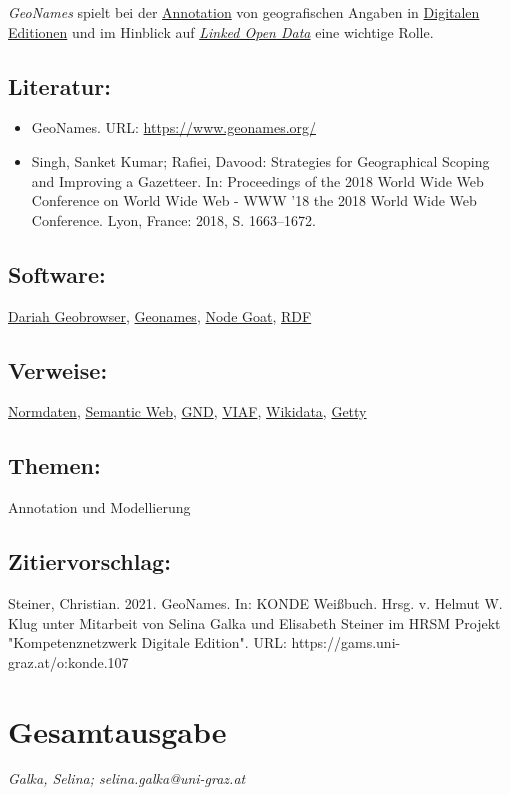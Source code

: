 \documentclass{article}
\begin{document}
        \emph{GeoNames} spielt bei der \href{http://gams.uni-graz.at/o:konde.17}{Annotation} von geografischen Angaben in \href{http://gams.uni-graz.at/o:konde.59}{Digitalen Editionen} und im Hinblick
                  auf \emph{\href{http://gams.uni-graz.at/o:konde.8}{Linked Open Data}} eine wichtige Rolle.\\
            
        \subsection*{Literatur:}\begin{itemize}\item GeoNames. URL: \url{https://www.geonames.org/}\item Singh, Sanket Kumar; Rafiei, Davood: Strategies for Geographical Scoping and Improving a
                              Gazetteer. In: Proceedings of the 2018 World Wide Web Conference on
                              World Wide Web - WWW '18 the 2018 World Wide Web Conference. Lyon, France: 2018, S. 1663–1672.\end{itemize}\subsection*{Software:}\href{https://geobrowser.de.dariah.eu/}{Dariah
                           Geobrowser}, \href{geonames.org}{Geonames}, \href{https://nodegoat.net/}{Node Goat}, \href{https://www.w3.org/RDF/}{RDF}\subsection*{Verweise:}\href{https://gams.uni-graz.at/o:konde.147}{Normdaten}, \href{https://gams.uni-graz.at/o:konde.167}{Semantic Web}, \href{https://gams.uni-graz.at/o:konde.109}{GND}, \href{https://gams.uni-graz.at/o:konde.111}{VIAF}, \href{https://gams.uni-graz.at/o:konde.112}{Wikidata}, \href{https://gams.uni-graz.at/o:konde.108}{Getty}\subsection*{Themen:}Annotation und Modellierung\subsection*{Zitiervorschlag:}Steiner, Christian. 2021. GeoNames. In: KONDE Weißbuch. Hrsg. v. Helmut W. Klug unter Mitarbeit von Selina Galka und Elisabeth Steiner im HRSM Projekt "Kompetenznetzwerk Digitale Edition". URL: https://gams.uni-graz.at/o:konde.107\newpage\section*{Gesamtausgabe} \emph{Galka, Selina; selina.galka@uni-graz.at }\\
        
\end{document}
